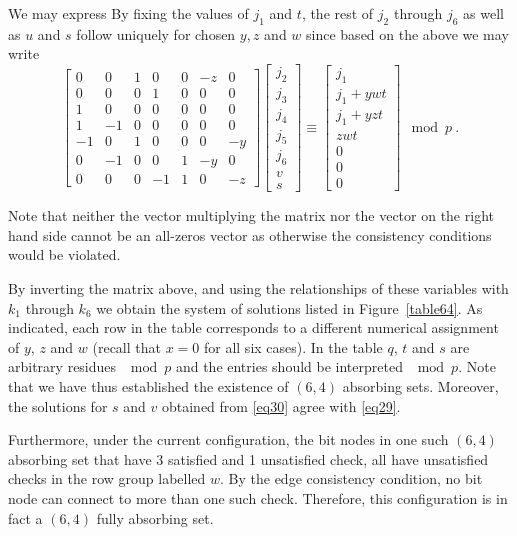 {We may express By fixing the values of $j_1$ and $t$, the rest of
$j_2$ through $j_6$ as well as $u$ and $s$ follow uniquely for
chosen $y,z$ and $w$ since based on the above we may write
\begin{equation}\label{eq30}
\left[ \begin{array}{ccccccc} 0 & 0 & 1 & 0 & 0 & -z &0\\
0 & 0 & 0 & 1 & 0 & 0 &0\\
1 & 0 & 0 & 0 & 0 & 0 &0\\
1 & -1 & 0 & 0 & 0 & 0 &0\\
-1 & 0 & 1 & 0 & 0 & 0 &-y\\
0 & -1 & 0 & 0 & 1 & -y &0\\
0 & 0 & 0 & -1 & 1 & 0 & -z
\end{array}\right] \left[\begin{array}{c}
j_2\\j_3\\j_4\\j_5\\j_6\\v\\s\end{array}\right] \equiv
\left[\begin{array}{c}j_1\\j_1+ywt\\j_1+yzt\\zwt\\0\\0\\0\end{array}\right]
\mod p~.
\end{equation}

Note that neither the vector multiplying the matrix nor the vector
on the right hand side cannot be an all-zeros vector as otherwise
the consistency conditions would be violated.

By inverting the matrix above, and using the relationships of
these variables with $k_1$ through $k_6$ we obtain the system of
solutions listed in Figure~\ref{table64}. As indicated, each row
in the table corresponds to a different numerical assignment of
$y$, $z$ and $w$ (recall that $x=0$ for all six cases). In the
table $q$, $t$ and $s$ are arbitrary residues $\mod p$ and the
entries should be interpreted $\mod p$. Note that we have thus
established the existence of $(6,4)$ absorbing sets. Moreover, the
solutions for $s$ and $v$ obtained from \eqref{eq30} agree with
\eqref{eq29}.

Furthermore, under the current configuration, the bit nodes in one
such $(6,4)$ absorbing set that have 3 satisfied and 1 unsatisfied
check, all have unsatisfied checks in the row group labelled $w$.
By the edge consistency condition, no bit node can connect to more
than one such check. Therefore, this configuration is in fact a
$(6,4)$ fully absorbing set.

}
